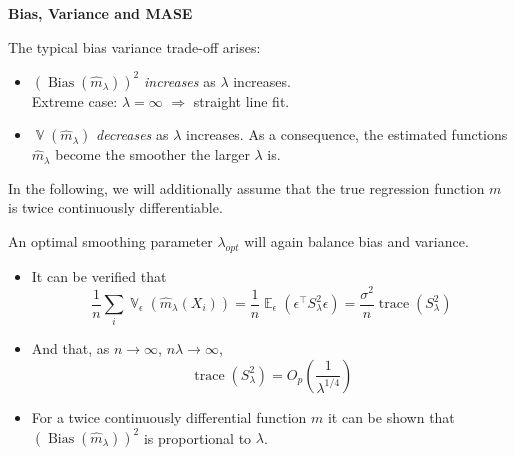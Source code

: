 \documentclass[14pt]{extreport}\usepackage[]{graphicx}\usepackage[]{xcolor}
\DeclareMathOperator{\E}{\mathbb{E}}
\DeclareMathOperator{\V}{\mathbb{V}}
\begin{document}
% 
% 
% 

\newpage
\textbf{Bias, Variance and MASE}

\bigskip


The typical bias variance trade-off arises:
\begin{itemize}
\item $(\operatorname{Bias}(\hat m_\lambda))^2$ \emph{increases} as $\lambda$ increases.\\
Extreme case: $\lambda=\infty$ $\Rightarrow$ straight line fit.
\item $\V(\hat m_\lambda)$  \emph{decreases} as $\lambda$ increases. As a consequence, the estimated functions $\hat m_\lambda$ become the smoother the larger $\lambda$ is.
\end{itemize}

\bigskip

In the following, we will additionally assume that the true regression function $m$ is twice continuously differentiable. 
\bigskip
 
An optimal smoothing parameter $\lambda_{opt}$ will again balance bias and variance.
\begin{itemize}
\item It can be verified that
$$\frac{1}{n}\sum_i \V_\epsilon(\hat m_\lambda(X_i))=\frac{1}{n}\E_\epsilon\left(\epsilon^\top S_\lambda^2\epsilon\right)
=\frac{\sigma^2}{n}\operatorname{trace}(S_\lambda^2)$$
\item And that, as $n\rightarrow\infty$, $n\lambda\rightarrow \infty$,
$$\operatorname{trace}(S_\lambda^2)=O_p\left(\frac{1}{\lambda^{1/4}}\right)$$
\item For a twice continuously differential function $m$ it can be shown that $(\operatorname{Bias}(\hat m_\lambda))^2$ is proportional to $\lambda$.
\end{itemize}
\end{document}
